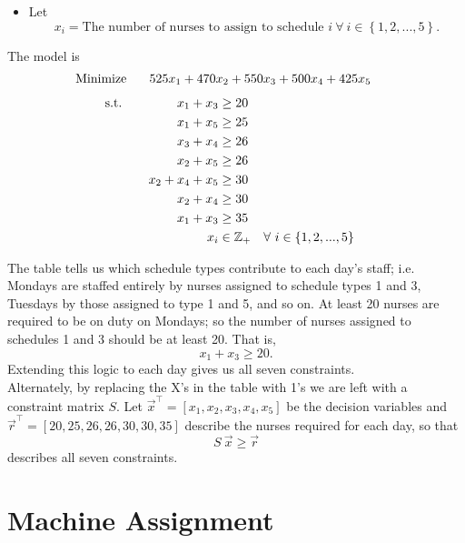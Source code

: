 \documentclass[../open-optimization/open-optimization.tex]{subfiles}
\begin{document}
\begin{itemize}
		\item Let 
		$$
		x_i = \textrm{The number of nurses to assign to schedule } i\ \forall\ i \in \left\lbrace 1,2,...,5 \right\rbrace.
		$$
\end{itemize}	
		\vspace{.25in}
		The model is
		\begin{align*}
		\textrm{Minimize}	\hspace{.25in}	525x_1+470x_2+550x_3+500x_4+425x_5&&&&
		\end{align*}
		\vspace{-.43in}
		\begin{align*}
		\textrm{s.t.} 		\hspace{.6in}	x_1+x_3 &\geq 20							\\
											x_1+x_5 &\geq 25							\\
											x_3+x_4 &\geq 26							\\
											x_2+x_5 &\geq 26							\\
										x_2+x_4+x_5 &\geq 30							\\
											x_2+x_4 &\geq 30							\\
											x_1+x_3 &\geq 35							\\
												x_i &\in \mathbb{Z}_+ & &\forall\ i \in \left\lbrace 1,2,...,5 \right\rbrace
		\end{align*}
		
		The table tells us which schedule types contribute to each day's staff; i.e. Mondays are staffed entirely by nurses assigned to schedule types 1 and 3, Tuesdays by those assigned to type 1 and 5, and so on. At least 20 nurses are required to be on duty on Mondays; so the number of nurses assigned to schedules 1 and 3 should be at least 20. That is,
			$$
			x_1+x_3 \geq 20.
			$$
		Extending this logic to each day gives us all seven constraints. \\
		
		Alternately, by replacing the X's in the table with 1's we are left with a constraint matrix $S$. Let $\vec{x}^\top = [x_1,x_2,x_3,x_4,x_5]$ be the decision variables and $\vec{r}^\top=[20,25,26,26,30,30,35]$ describe the nurses required for each day, so that
			$$
			S\ \vec{x} \geq \vec{r}
			$$
		describes all seven constraints. 

\section{Machine Assignment}
\end{document}
